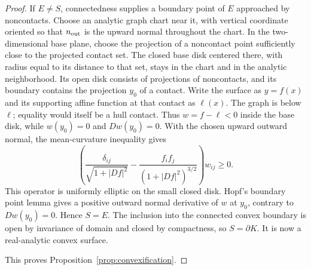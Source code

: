 \documentclass[11pt]{article}
\begin{document}
\begin{proof}
If $E\ne S$, connectedness supplies a boundary point of $E$ approached by noncontacts. Choose an analytic graph chart near it, with vertical coordinate oriented so that $n_{\rm out}$ is the upward normal throughout the chart. In the two-dimensional base plane, choose the projection of a noncontact point sufficiently close to the projected contact set. The closed base disk centered there, with radius equal to its distance to that set, stays in the chart and in the analytic neighborhood. Its open disk consists of projections of noncontacts, and its boundary contains the projection $y_0$ of a contact. Write the surface as $y=f(x)$ and its supporting affine function at that contact as $\ell(x)$. The graph is below $\ell$; equality would itself be a hull contact. Thus $w=f-\ell<0$ inside the base disk, while $w(y_0)=0$ and $Dw(y_0)=0$. With the chosen upward outward normal, the mean-curvature inequality gives
\[
 \left(\frac{\delta_{ij}}{\sqrt{1+|Df|^2}}
 -\frac{f_if_j}{(1+|Df|^2)^{3/2}}\right)w_{ij}\ge0.
\]
This operator is uniformly elliptic on the small closed disk. Hopf's boundary point lemma \cite[Chapter 3]{GT} gives a positive outward normal derivative of $w$ at $y_0$, contrary to $Dw(y_0)=0$. Hence $S=E$. The inclusion into the connected convex boundary is open by invariance of domain and closed by compactness, so $S=\partial K$. It is now a real-analytic convex surface.

This proves Proposition~\ref{prop:convexification}.
\end{proof}
\appendix
\end{document}
